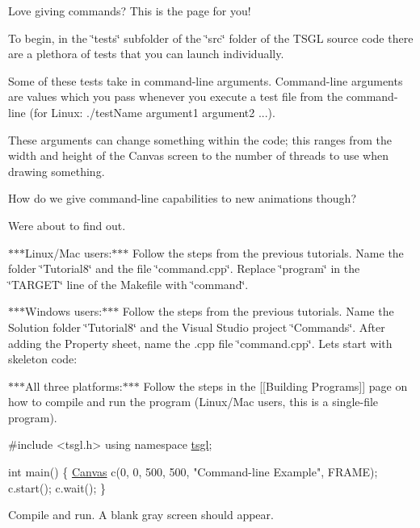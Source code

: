 Love giving commands? This is the page for you!

To begin, in the \char`\"{}tests\char`\"{} subfolder of the \char`\"{}src\char`\"{} folder of the T\+S\+G\+L source code there are a plethora of tests that you can launch individually.

Some of these tests take in command-\/line arguments. Command-\/line arguments are values which you pass whenever you execute a test file from the command-\/line (for Linux\+: ./test\+Name argument1 argument2 ...).

These arguments can change something within the code; this ranges from the width and height of the Canvas screen to the number of threads to use when drawing something.

How do we give command-\/line capabilities to new animations though?

We\textquotesingle{}re about to find out.

$\ast$$\ast$$\ast$\+Linux/\+Mac users\+:$\ast$$\ast$$\ast$ Follow the steps from the previous tutorials. Name the folder \char`\"{}\+Tutorial8\char`\"{} and the file \char`\"{}command.\+cpp\char`\"{}. Replace \char`\"{}program\char`\"{} in the \char`\"{}\+T\+A\+R\+G\+E\+T\char`\"{} line of the Makefile with \char`\"{}command\char`\"{}.

$\ast$$\ast$$\ast$\+Windows users\+:$\ast$$\ast$$\ast$ Follow the steps from the previous tutorials. Name the Solution folder \char`\"{}\+Tutorial8\char`\"{} and the Visual Studio project \char`\"{}\+Commands\char`\"{}. After adding the Property sheet, name the .cpp file \char`\"{}command.\+cpp\char`\"{}. Let\textquotesingle{}s start with skeleton code\+:

$\ast$$\ast$$\ast$\+All three platforms\+:$\ast$$\ast$$\ast$ Follow the steps in the \mbox{[}\mbox{[}Building Programs\mbox{]}\mbox{]} page on how to compile and run the program (Linux/\+Mac users, this is a single-\/file program).


\begin{DoxyCode}
\textcolor{preprocessor}{#include <tsgl.h>}
\textcolor{keyword}{using namespace }\hyperlink{namespacetsgl}{tsgl};

\textcolor{keywordtype}{int} main() \{
  \hyperlink{classtsgl_1_1_canvas}{Canvas} c(0, 0, 500, 500, \textcolor{stringliteral}{"Command-line Example"}, FRAME);
  c.start();
  c.wait();
\}
\end{DoxyCode}


Compile and run. A blank gray screen should appear.

